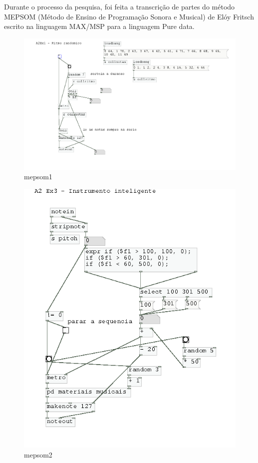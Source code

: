\documentclass{ppgmus}
\begin{document}
Durante o processo da pesquisa, foi feita a transcrição de partes do método MEPSOM (Método de Ensino
de Programação Sonora e Musical) de Elóy Fritsch escrito na linguagem MAX/MSP para a linguagem
Pure data.


\begin{figure}
\includegraphics[scale=.4]{mepsom1}
\caption{mepsom1}
\label{mepsom1}
\end{figure}

\begin{figure}
\includegraphics[scale=.4]{mepsom2}
\caption{mepsom2}
\label{mepsom2}
\end{figure}
\end{document}
